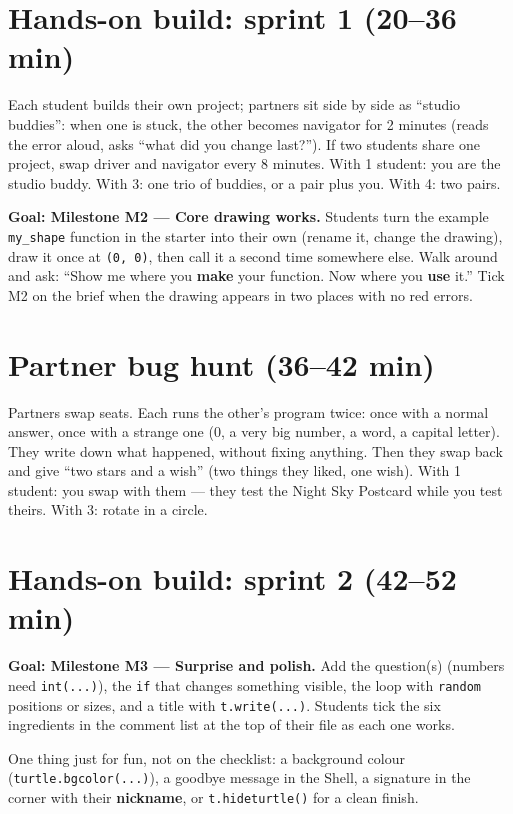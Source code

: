 \section{Hands-on build: sprint 1 (20--36 min)}
\begin{pairroles}
Each student builds their own project; partners sit side by side as \enquote{studio buddies}: when one is stuck, the other becomes navigator for 2 minutes (reads the error aloud, asks \enquote{what did you change last?}). If two students share one project, swap driver and navigator every 8 minutes.
With 1 student: you are the studio buddy. With 3: one trio of buddies, or a pair plus you. With 4: two pairs.
\end{pairroles}
\textbf{Goal: Milestone M2 --- Core drawing works.} Students turn the example \texttt{my\_shape} function in the starter into their own (rename it, change the drawing), draw it once at \texttt{(0, 0)}, then call it a second time somewhere else. Walk around and ask: \enquote{Show me where you \textbf{make} your function. Now where you \textbf{use} it.} Tick M2 on the brief when the drawing appears in two places with no red errors.

\section{Partner bug hunt (36--42 min)}
\begin{bughunt}
Partners swap seats. Each runs the other's program twice: once with a normal answer, once with a strange one (0, a very big number, a word, a capital letter). They write down what happened, without fixing anything. Then they swap back and give \enquote{two stars and a wish} (two things they liked, one wish). With 1 student: you swap with them --- they test the Night Sky Postcard while you test theirs. With 3: rotate in a circle.
\end{bughunt}

\section{Hands-on build: sprint 2 (42--52 min)}
\textbf{Goal: Milestone M3 --- Surprise and polish.} Add the question(s) (numbers need \texttt{int(...)}), the \texttt{if} that changes something visible, the loop with \texttt{random} positions or sizes, and a title with \texttt{t.write(...)}. Students tick the six ingredients in the comment list at the top of their file as each one works.
\begin{freebuild}
One thing just for fun, not on the checklist: a background colour (\texttt{turtle.bgcolor(...)}), a goodbye message in the Shell, a signature in the corner with their \textbf{nickname}, or \texttt{t.hideturtle()} for a clean finish.
\end{freebuild}

